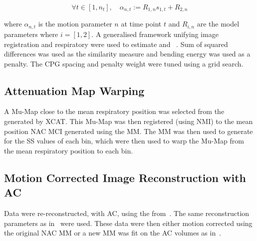         
        \begin{equation}
            \forall t \in [1, n_t],\quad \alpha_{n, t} := R_{1, n} s_{1, t} + R_{2, n}
        \end{equation}
        
        
        \noindent where $\alpha_{n, t}$ is the motion parameter $n$ at time point $t$ and $R_{i, n}$ are the model parameters where $i = [1, 2]$. A generalised framework unifying image registration and respiratory  were used to estimate  and ~\cite{McClelland2017}. Sum of squared differences was used as the similarity measure and bending energy was used as a penalty. The \gls{CPG} spacing and penalty weight were tuned using a grid search.
    
    
    \subsection{Attenuation Map Warping} \label{sec:attenuation_map_warping}
        A \gls{Mu-Map} close to the mean respiratory position was selected from the  generated by \gls{XCAT}. This \gls{Mu-Map} was then registered (using \gls{NMI}) to the mean position \gls{NAC} \gls{MCI} generated using the \gls{MM}.
        The \gls{MM} was then used to generate  for the \gls{SS} values of each bin, which were then used to warp the \gls{Mu-Map} from the mean respiratory position to each bin.
    
    
    \subsection{Motion Corrected Image Reconstruction with AC} \label{sec:attenuation_corrected_image_reconstruction}
        Data were re-reconstructed, with \gls{AC}, using the  from~. The same reconstruction parameters as in~ were used. These data were then either motion corrected using the original \gls{NAC} \gls{MM} or a new \gls{MM} was fit on the \gls{AC} volumes as in~.
    
